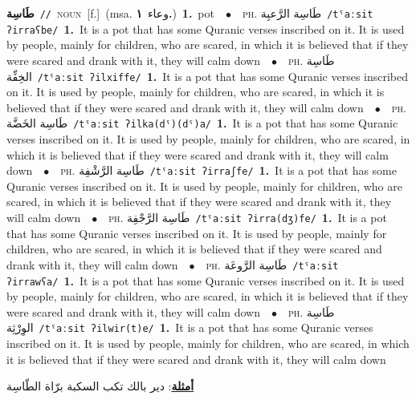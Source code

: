 \documentclass[10pt,a4paper,twoside]{article} %
\begin{document}
\begin{multicols}{2}
{{\setlength\topsep{0pt}\textbf{\foreignlanguage{arabic}{طَاسِة}}\ {\color{gray}\texttt{//}\color{black}}\ \textsc{noun}\ [f.]\ \color{gray}(msa. \foreignlanguage{arabic}{وعاء}~\foreignlanguage{arabic}{\textbf{١.}})\color{black}\ \textbf{1.}~pot\ \ $\bullet$\ \ \textsc{ph.} \color{gray} \foreignlanguage{arabic}{طَاسِة الرَّعبِة}\color{black}\ {\color{gray}\texttt{/{\sffamily tˤaːsit ʔirraʕbe}/}\color{black}}\ \textbf{1.}~It is a pot that has some Quranic verses inscribed on it. It is used by people, mainly for children, who are scared, in which it is believed that if they were scared and drank with it, they will calm down\ \ $\bullet$\ \ \textsc{ph.} \color{gray} \foreignlanguage{arabic}{طَاسِة الخِفِّة}\color{black}\ {\color{gray}\texttt{/{\sffamily tˤaːsit ʔilxiffe}/}\color{black}}\ \textbf{1.}~It is a pot that has some Quranic verses inscribed on it. It is used by people, mainly for children, who are scared, in which it is believed that if they were scared and drank with it, they will calm down\ \ $\bullet$\ \ \textsc{ph.} \color{gray} \foreignlanguage{arabic}{طَاسِة الخَضَّة}\color{black}\ {\color{gray}\texttt{/{\sffamily tˤaːsit ʔilka(dˤ)(dˤ)a}/}\color{black}}\ \textbf{1.}~It is a pot that has some Quranic verses inscribed on it. It is used by people, mainly for children, who are scared, in which it is believed that if they were scared and drank with it, they will calm down\ \ $\bullet$\ \ \textsc{ph.} \color{gray} \foreignlanguage{arabic}{طَاسِة الرَّشْفِة}\color{black}\ {\color{gray}\texttt{/{\sffamily tˤaːsit ʔirraʃfe}/}\color{black}}\ \textbf{1.}~It is a pot that has some Quranic verses inscribed on it. It is used by people, mainly for children, who are scared, in which it is believed that if they were scared and drank with it, they will calm down\ \ $\bullet$\ \ \textsc{ph.} \color{gray} \foreignlanguage{arabic}{طَاسِة الرَّجْفِة}\color{black}\ {\color{gray}\texttt{/{\sffamily tˤaːsit ʔirra(dʒ)fe}/}\color{black}}\ \textbf{1.}~It is a pot that has some Quranic verses inscribed on it. It is used by people, mainly for children, who are scared, in which it is believed that if they were scared and drank with it, they will calm down\ \ $\bullet$\ \ \textsc{ph.} \color{gray} \foreignlanguage{arabic}{طَاسِة الرَّوعَة}\color{black}\ {\color{gray}\texttt{/{\sffamily tˤaːsit ʔirrawʕa}/}\color{black}}\ \textbf{1.}~It is a pot that has some Quranic verses inscribed on it. It is used by people, mainly for children, who are scared, in which it is believed that if they were scared and drank with it, they will calm down\ \ $\bullet$\ \ \textsc{ph.} \color{gray} \foreignlanguage{arabic}{طَاسِة الوِرْثِة}\color{black}\ {\color{gray}\texttt{/{\sffamily tˤaːsit ʔilwir(t)e}/}\color{black}}\ \textbf{1.}~It is a pot that has some Quranic verses inscribed on it. It is used by people, mainly for children, who are scared, in which it is believed that if they were scared and drank with it, they will calm down\  \begin{flushright}\color{gray}\foreignlanguage{arabic}{\textbf{\underline{\foreignlanguage{arabic}{أمثلة}}}: دير بالك تكب السكبة برّاة الطّاسِة}\end{flushright}\color{black}} \vspace{2mm}

}
\end{multicols}
\end{document}

